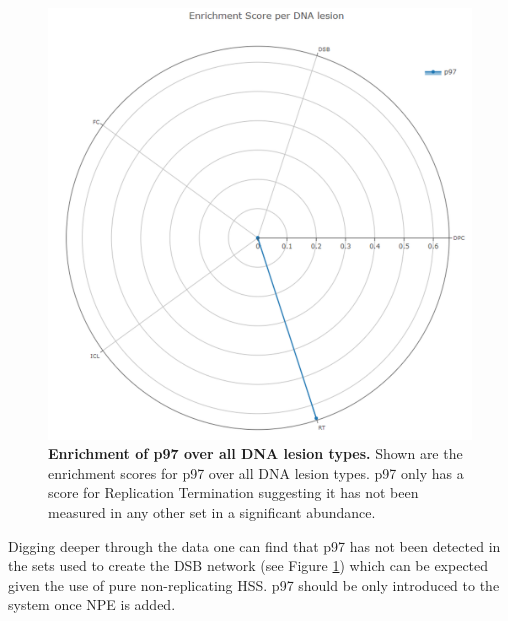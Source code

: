 \begin{figure}[H]
    \centering
    \includegraphics[width=.5\textwidth]{resources/images/Results/p97_enrichment.png}
    \caption[Enrichment of p97 over all DNA lesion types]{\textbf{Enrichment of p97 over all DNA lesion types. }Shown are the enrichment scores for p97 over all DNA lesion types. p97 only has a score for Replication Termination suggesting it has not been measured in any other set in a significant abundance.}
    \label{fig:p97dpc}
\end{figure}
Digging deeper through the data one can find that p97 has not been detected in the sets used to create the DSB network (see Figure \ref{fig:p97dpc}) which can be expected given the use of pure non-replicating HSS. p97 should be only introduced to the system once NPE is added.


